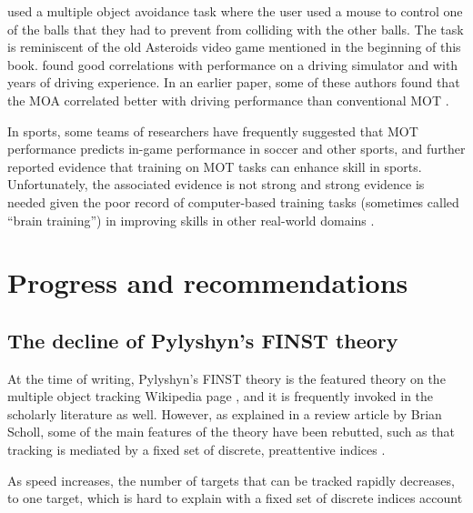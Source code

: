 \documentclass[
]{book}
\begin{document}
\citet{mackenzieMultipleObjectAvoidance2021} used a multiple object avoidance task where the user used a mouse to control one of the balls that they had to prevent from colliding with the other balls. The task is reminiscent of the old Asteroids video game mentioned in the beginning of this book. \citet{mackenzieMultipleObjectAvoidance2021} found good correlations with performance on a driving simulator and with years of driving experience. In an earlier paper, some of these authors found that the MOA correlated better with driving performance than conventional MOT \citet{mackenzieLinkAttentionalFunction2017}.

In sports, some teams of researchers have frequently suggested that MOT performance predicts in-game performance in soccer and other sports, and further reported evidence that training on MOT tasks can enhance skill in sports. Unfortunately, the associated evidence is not strong \citep{vaterCriticalSystematicReview2021} and strong evidence is needed given the poor record of computer-based training tasks (sometimes called ``brain training'') in improving skills in other real-world domains \citep{simonsBraintrainingProgramsWork2016}.

\hypertarget{progress-and-recommendations}{%
\chapter{Progress and recommendations}\label{progress-and-recommendations}}

\hypertarget{the-decline-of-pylyshyns-finst-theory}{%
\section{The decline of Pylyshyn's FINST theory}\label{the-decline-of-pylyshyns-finst-theory}}

At the time of writing, Pylyshyn's FINST theory is the featured theory on the multiple object tracking Wikipedia page \citep{MultipleObjectTracking2021}, and it is frequently invoked in the scholarly literature as well. However, as explained in a review article by Brian Scholl, some of the main features of the theory have been rebutted, such as that tracking is mediated by a fixed set of discrete, preattentive indices \citep{schollWhatHaveWe2008}.

As speed increases, the number of targets that can be tracked rapidly decreases, to one target, which is hard to explain with a fixed set of discrete indices account \citep{alvarezHowManyObjects2007, holcombeExhaustingAttentionalTracking2012}
\end{document}
